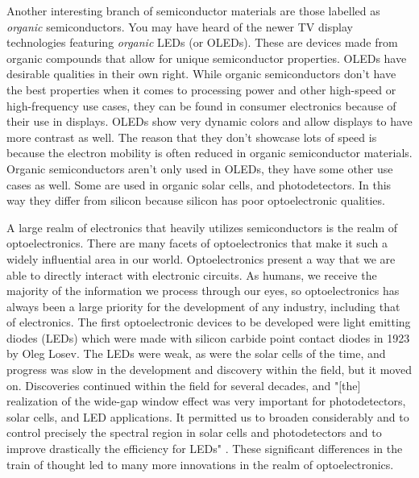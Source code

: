 \documentclass[12pt]{article}
\begin{document}
\begin{flushleft}
Another interesting branch of semiconductor materials
are those labelled as \emph{organic} semiconductors.
You may have heard of the newer TV display technologies
featuring \emph{organic} LEDs (or OLEDs). These are
devices made from organic compounds that allow for
unique semiconductor properties. OLEDs have desirable
qualities in their own right. While organic semiconductors
don't have the best properties when it comes to processing
power and other high-speed or high-frequency use cases,
they can be found in consumer electronics because of
their use in displays. OLEDs show very dynamic colors
and allow displays to have more contrast as well. The
reason that they don't showcase lots of speed is because
the electron mobility is often reduced in organic semiconductor
materials. Organic semiconductors aren't only used
in OLEDs, they have some other use cases as well. 
Some are used in organic solar cells, and photodetectors.
In this way they differ from silicon because silicon
has poor optoelectronic qualities.

A large realm of electronics that heavily utilizes
semiconductors is the realm of optoelectronics. There
are many facets of optoelectronics that make it such
a widely influential area in our world. Optoelectronics
present a way that we are able to directly interact
with electronic circuits. As humans, we receive the
majority of the information we process through our
eyes, so optoelectronics has always been a large priority
for the development of any industry, including that
of electronics. The first optoelectronic devices to
be developed were light emitting diodes (LEDs) which
were made with silicon carbide point contact diodes
in 1923 by Oleg Losev. The LEDs were weak, as were
the solar cells of the time, and progress was slow
in the development and discovery within the field,
but it moved on. Discoveries continued within the field
for several decades, and "[the] realization of the
wide-gap window effect was very important for photodetectors,
solar cells, and LED applications. It permitted us
to broaden considerably and to control precisely the
spectral region in solar cells and photodetectors and
to improve drastically the efficiency for LEDs" \parencite{ZhoresOpto}.
These significant differences in the train of thought
led to many more innovations in the realm of optoelectronics.


\end{flushleft}
\end{document}
